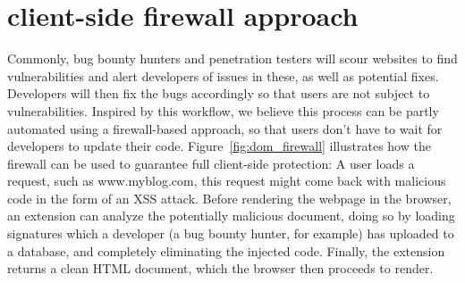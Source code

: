 \section{client-side firewall approach}
 Commonly, bug bounty hunters and penetration testers will scour websites to find vulnerabilities and alert developers of issues in these, as well as potential fixes. Developers will then fix the bugs accordingly so that users are not subject to vulnerabilities. Inspired by this workflow, we believe this process can be partly automated using a firewall-based approach, so that users don't have to wait for developers to update their code. Figure~\ref{fig:dom_firewall} illustrates how the firewall can be used to guarantee full client-side protection: A user loads a request, such as www.myblog.com, this request might come back with malicious code in the form of an XSS attack. Before rendering the webpage in the browser, an extension can analyze the potentially malicious document, doing so by loading signatures which a developer (a bug bounty hunter, for example) has uploaded to a database, and completely eliminating the injected code. Finally, the extension returns a clean HTML document, which the browser then proceeds to render.


